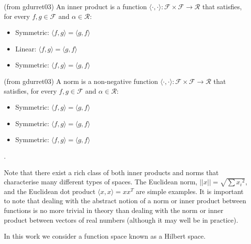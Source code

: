 \theoremstyle{definition}
\begin{definition}
(from gdurret03)
An inner product is a function $\langle \cdot, \cdot\rangle : \mathcal{F} \times \mathcal{F} \rightarrow \mathcal{R}$ that satisfies, for every $f, g \in \mathcal{F}$ and $\alpha \in \mathcal{R}$:
\begin{itemize}
\item {Symmetric: $\langle f, g\rangle = \langle g, f\rangle$}
\item {Linear: $\langle f, g\rangle = \langle g, f\rangle$}
\item {Symmetric: $\langle f, g\rangle = \langle g, f\rangle$}
\end{itemize}
\end{definition}

\theoremstyle{definition}
\begin{definition}
(from gdurret03)
A norm is a non-negative function $\langle \cdot, \cdot\rangle : \mathcal{F} \times \mathcal{F} \rightarrow \mathcal{R}$ that satisfies, for every $f, g \in \mathcal{F}$ and $\alpha \in \mathcal{R}$:
\begin{itemize}
\item {Symmetric: $\langle f, g\rangle = \langle g, f\rangle$}
\item {Symmetric: $\langle f, g\rangle = \langle g, f\rangle$}
\item {Symmetric: $\langle f, g\rangle = \langle g, f\rangle$}
\end{itemize}
\end{definition}.

Note that there exist a rich class of both inner products and norms that characterise many different types of spaces. The Euclidean norm, $||x|| = \sqrt{\sum{x_i}^2}$, and the Euclidean dot product $\langle x, x\rangle = xx^T$ are simple examples. It is important to note that dealing with the abstract notion of a norm or inner product between functions is no more trivial in theory than dealing with the norm or inner product between vectors of real numbers (although it may well be in practice). 

In this work we consider a function space known as a Hilbert space. 








































